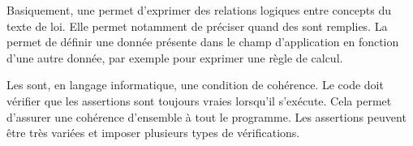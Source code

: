 Basiquement, une  permet d’exprimer des relations logiques entre concepts du texte de loi. Elle permet notamment de préciser quand des  sont remplies. La  permet de définir une donnée présente dans le champ d'application en fonction d’une autre donnée, par exemple pour exprimer une règle de calcul.

Les  sont, en langage informatique, une condition de cohérence. Le code doit vérifier que les assertions sont toujours vraies lorsqu’il s’exécute. Cela permet d’assurer une cohérence d’ensemble à tout le programme. Les assertions peuvent être très variées et imposer plusieurs types de vérifications.
